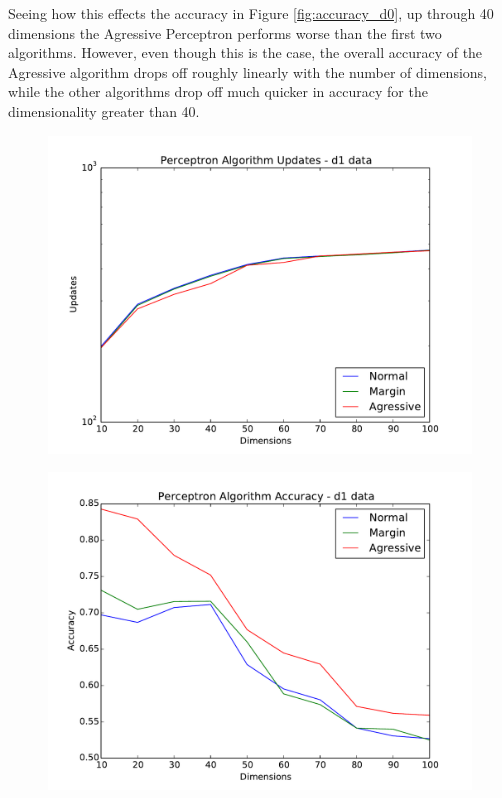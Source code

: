 \begin{enumerate}
Seeing how this effects the accuracy in Figure \ref{fig:accuracy_d0}, up through 40
dimensions the Agressive Perceptron performs worse than the first two algorithms.
However, even though this is the case, the overall accuracy of the Agressive algorithm
drops off roughly linearly with the number of dimensions, while the other algorithms
drop off much quicker in accuracy for the dimensionality greater than 40.

\begin{figure}[H]
\centering
\begin{minipage}{.5\textwidth}
  \centering
  \includegraphics[width=\linewidth]{d1_updates.pdf}
  \label{fig:updates_d1}
\end{minipage}%
\begin{minipage}{.5\textwidth}
  \centering
  \includegraphics[width=\linewidth]{d1_accuracy.pdf}
  \label{fig:accuracy_d1}
\end{minipage}
\end{figure}


\end{enumerate}
